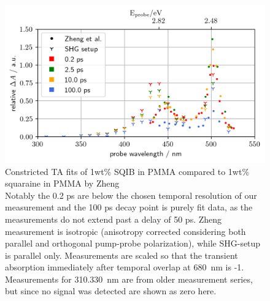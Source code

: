 \documentclass[twoside,openright]{scrreprt}
\begin{document}
{\begin{figure}[hbtp]
\centering
\includegraphics[scale=1]{images/TimeResolvedWavScanvsZheng_Zoom.png}
\caption{Constricted TA fits of 1wt\% SQIB in PMMA compared to 1wt\% squaraine in PMMA by Zheng\protect\cite{Zheng2020}\\ Notably the 0.2 ps are below the chosen temporal resolution of our measurement and the 100 ps decay point is purely fit data, as the measurements do not extend past a delay of 50 ps. 
Zheng measurement is isotropic (anisotropy corrected considering both parallel and orthogonal pump-probe polarization), while SHG-setup is parallel only. Measurements are scaled so that the transient absorption immediately after temporal overlap at \SI{680}{\nano\meter} is -1. Measurements for \SIlist{310, 330}{\nano\meter} are from older measurement series, but since no signal was detected are shown as zero here.\label{fig:TA_vsZheng_Zoomed}}
\end{figure}


}
\end{document}
